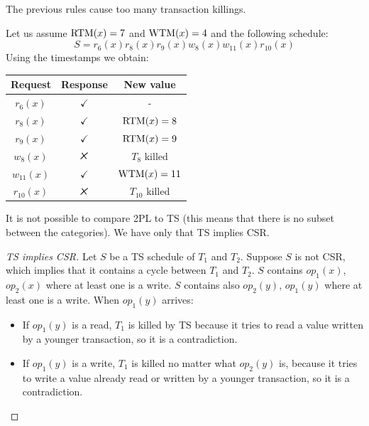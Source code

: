 \documentclass[12pt, a4paper]{report}
\begin{document}
    The previous rules cause too many transaction killings. 
    \begin{example}
        Let us assume $\textnormal{RTM}(x)=7$ and $\textnormal{WTM}(x)=4$ and the following schedule: 
        \[S=r_6(x) r_8(x) r_9(x) w_8(x) w_{11}(x) r_{10}(x)\]
        Using the timestamps we obtain: 
        \begin{table}[H]
            \centering
            \begin{tabular}{ccc}
            \textbf{Request} & \textbf{Response} & \textbf{New value} \\ \hline
            $r_6(x)$         & $\checkmark$      & -                  \\
            $r_8(x)$         & $\checkmark$      & $\textnormal{RTM}(x)=8$         \\
            $r_9(x)$         & $\checkmark$      & $\textnormal{RTM}(x)=9$         \\
            $w_8(x)$         & $\tikzxmark$      & $T_8$ killed       \\
            $w_{11}(x)$      & $\checkmark$      & $\textnormal{WTM}(x)=11$        \\
            $r_{10}(x)$      & $\tikzxmark$      & $T_{10}$ killed   
            \end{tabular}
        \end{table}
    \end{example}
    It is not possible to compare 2PL to TS (this means that there is no subset between the categories). We have only that TS implies CSR. 
    \begin{proof}[TS implies CSR]
        Let $S$ be a TS schedule of $T_1$ and $T_2$. Suppose $S$ is not CSR, which implies that it contains a cycle between $T_1$ and $T_2$. $S$ contains $op_1(x)$, $op_2(x)$ where at 
        least one is a write. $S$ contains also $op_2(y)$, $op_1(y)$ where at least one is a write. 
        When $op_1(y)$ arrives:
        \begin{itemize}
            \item If $op_1(y)$ is a read, $T_1$ is killed by TS because it tries to read a value written by a younger transaction, so it is a contradiction. 
            \item If $op_1(y)$ is a write, $T_1$ is killed no matter what $op_2(y)$ is, because it tries to write a value already read or written by a younger transaction, so it is a 
                contradiction. 
        \end{itemize}
    \end{proof}
\end{document}
